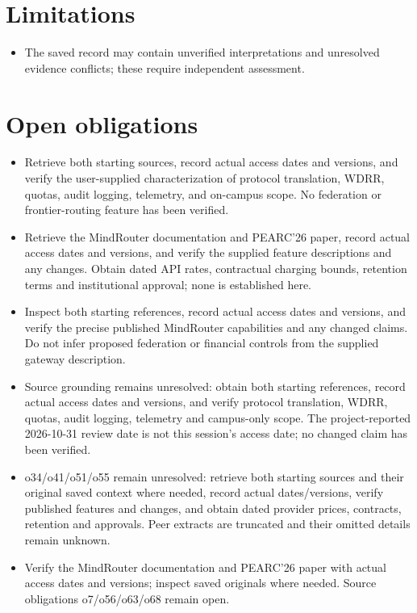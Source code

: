 \documentclass[11pt]{article}
\begin{document}
\section{Limitations}
\begin{itemize}
\item The saved record may contain unverified interpretations and unresolved evidence conflicts; these require independent assessment.
\end{itemize}
\section{Open obligations}
\begin{itemize}
\item Retrieve both starting sources, record actual access dates and versions, and verify the user-supplied characterization of protocol translation, WDRR, quotas, audit logging, telemetry, and on-campus scope. No federation or frontier-routing feature has been verified.
\item Retrieve the MindRouter documentation and PEARC'26 paper, record actual access dates and versions, and verify the supplied feature descriptions and any changes. Obtain dated API rates, contractual charging bounds, retention terms and institutional approval; none is established here.
\item Inspect both starting references, record actual access dates and versions, and verify the precise published MindRouter capabilities and any changed claims. Do not infer proposed federation or financial controls from the supplied gateway description.
\item Source grounding remains unresolved: obtain both starting references, record actual access dates and versions, and verify protocol translation, WDRR, quotas, audit logging, telemetry and campus-only scope. The project-reported 2026-10-31 review date is not this session's access date; no changed claim has been verified.
\item o34/o41/o51/o55 remain unresolved: retrieve both starting sources and their original saved context where needed, record actual dates/versions, verify published features and changes, and obtain dated provider prices, contracts, retention and approvals. Peer extracts are truncated and their omitted details remain unknown.
\item Verify the MindRouter documentation and PEARC'26 paper with actual access dates and versions; inspect saved originals where needed. Source obligations o7/o56/o63/o68 remain open.

\end{itemize}
\end{document}
